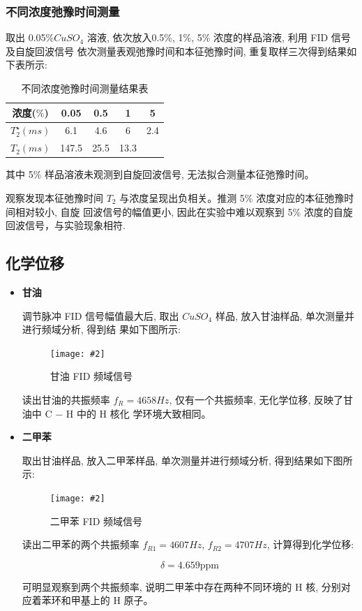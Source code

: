 \documentclass[12pt,a4paper]{article}
\newcommand{\be}[1]{
    \begin{equation}
        #1
    \end{equation}
}
\newcommand{\bfig}[3]{
    \begin{figure}[H]
        \centering
        \texttt{[image: \#2]}
        \caption{#3}
    \end{figure}
}
\begin{document}
\subsubsection{不同浓度弛豫时间测量}
取出 0.05\%$CuS O_4$ 溶液, 依次放入0.5\%, 1\%, 5\% 浓度的样品溶液, 利用 FID 信号及自旋回波信号
依次测量表观弛豫时间和本征弛豫时间, 重复取样三次得到结果如下表所示:
\begin{table}[H]
    \centering 
    \begin{tabular}{|c|c|c|c|c|}
    \hline
    浓度($\%$)  & 0.05  & 0.5  & 1    & 5   \\ \hline
    $T_2^{\star}(ms)$ & 6.1   & 4.6  & 6    & 2.4 \\ \hline
    $T_2(ms)$  & 147.5 & 25.5 & 13.3 &     \\ \hline
    \end{tabular}
    \caption{不同浓度弛豫时间测量结果表}
    \end{table}

其中 5\% 样品溶液未观测到自旋回波信号, 无法拟合测量本征弛豫时间。

观察发现本征弛豫时间 $T_2$ 与浓度呈现出负相关。推测 5\% 浓度对应的本征弛豫时间相对较小, 自旋
回波信号的幅值更小, 因此在实验中难以观察到 5\% 浓度的自旋回波信号，与实验现象相符.

\subsection{化学位移}
\begin{itemize}
    \item \textbf{甘油}
    
    调节脉冲 FID 信号幅值最大后, 取出 $CuS O_4$ 样品, 放入甘油样品, 单次测量并进行频域分析, 得到结
果如下图所示:
\bfig{0.7}{甘油.png}{甘油 FID 频域信号}

读出甘油的共振频率 $f_R = 4658Hz$, 仅有一个共振频率, 无化学位移, 反映了甘油中 C − H 中的 H 核化
学环境大致相同。

    \item \textbf{二甲苯}
    
    取出甘油样品, 放入二甲苯样品, 单次测量并进行频域分析, 得到结果如下图所示:

    \bfig{0.7}{二甲苯.png}{二甲苯 FID 频域信号}

    读出二甲苯的两个共振频率 $f_{R1} = 4607Hz$, $f_{R2} = 4707Hz$, 计算得到化学位移:

    \be{\delta= 4.659\mathrm{ppm}}
    可明显观察到两个共振频率, 说明二甲苯中存在两种不同环境的 H 核, 分别对应着苯环和甲基上的 H
原子。
\end{itemize}
\end{document}
